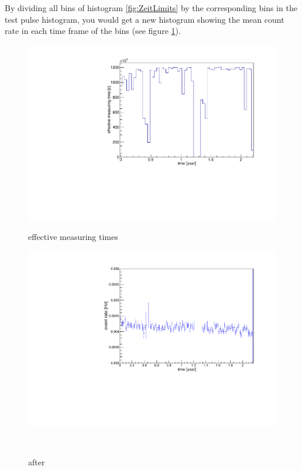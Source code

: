 \documentclass[encoding=utf8,british]{tumphthesis}
\begin{document}
By dividing all bins of histogram \ref{fig:ZeitLimits} by the corresponding bins in the test pulse histogram, you would get a new histogram showing the mean count rate in each time frame of the bins (see figure \ref{fig:ChangeInEventRate}).
\\
\begin{figure}[t!]
	\centering
	\begin{minipage}{.5\textwidth}
		\centering
		\includegraphics[width=\textwidth]{./Bilder/testpuler.pdf}
		\caption{effective measuring times}
		\label{fig:effectiveMeasuringTimes}
	\end{minipage}\hfill%
	\begin{minipage}{.5\textwidth}
		\centering
		\includegraphics[width=\textwidth]{./Bilder/eventRate.pdf}
		\caption{after}
		\label{fig:ChangeInEventRate}
	\end{minipage}
	\\
\end{figure}
\end{document}
